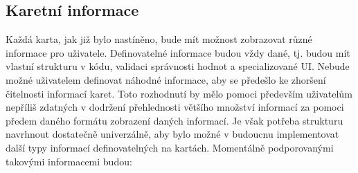 	\subsection{Karetní informace}

	Každá karta, jak již bylo nastíněno, bude mít možnost zobrazovat různé informace pro uživatele.
	Definovatelné informace budou vždy dané, tj. budou mít vlastní strukturu v kódu, validaci správnosti hodnot a specializované
	\ac{UI}.
	Nebude možné uživatelem definovat náhodné informace, aby se předešlo ke zhoršení čitelnosti informací karet.
	Toto rozhodnutí by mělo pomoci především uživatelům nepříliš zdatných v dodržení přehlednosti většího množství
	informací za pomoci předem daného formátu zobrazení daných informací.
	Je však potřeba strukturu navrhnout dostatečně univerzálně, aby bylo možné v budoucnu implementovat další typy informací
	definovatelných na kartách.
	Momentálně podporovanými takovými informacemi budou:
